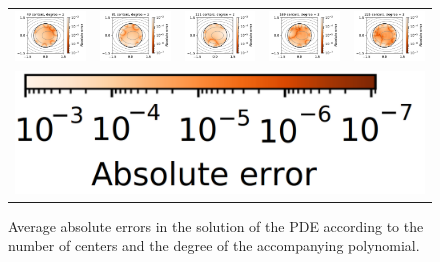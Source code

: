 \documentclass[12pt]{report} %
\begin{document}
\begin{figure}
\begin{tabular}{ccccc}
    {\includegraphics[width=.2\textwidth, clip=true,trim={0 0 2.1cm 0}]{imagenes/experiments/2d/pde_parabola/parabola_49_2.pdf}} & {\includegraphics[width=.2\textwidth, clip=true,trim={0 0 2.1cm 0}]{imagenes/experiments/2d/pde_parabola/parabola_81_2.pdf}} & {\includegraphics[width=.2\textwidth, clip=true,trim={0 0 2.1cm 0}]{imagenes/experiments/2d/pde_parabola/parabola_121_2.pdf}} & {\includegraphics[width=.2\textwidth, clip=true,trim={0 0 2.1cm 0}]{imagenes/experiments/2d/pde_parabola/parabola_169_2.pdf}} & {\includegraphics[width=.2\textwidth, clip=true,trim={0 0 2.1cm 0}]{imagenes/experiments/2d/pde_parabola/parabola_225_2.pdf}} \\
    \multicolumn{5}{c}{\includegraphics[width=.2\textwidth]{imagenes/experiments/2d/pde_parabola/legend_parabola_pde.png}}
  \end{tabular}
  \caption{Average absolute errors in the solution of the PDE according to the number of centers and the degree of the accompanying polynomial.}
  \label{fig:2d-pde-results-average-errors}
\end{figure}



\end{document}
